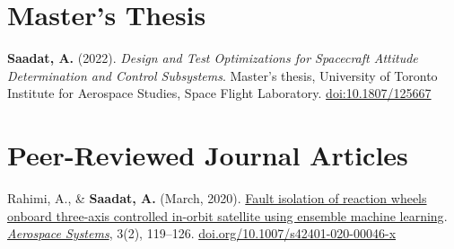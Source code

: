 \documentclass[letterpaper,11pt]{article}
\newcommand{\shiftleft}[2]{\makebox[0pt][r]{\makebox[#1][l]{#2}}}
\newcommand{\cvIcon}[1]{\BeginAccSupp{ActualText={}}#1\EndAccSupp{}}
\def\shiftleft#1#2{}%
\def\faGraduationCap{}%
\def\faBook{}%
\begin{document}
\section[Master's Thesis]{\shiftleft{18pt}{\cvIcon{\faGraduationCap}} Master's Thesis}
 \begin{itemize}[leftmargin=0.15in, label={}]
    \small{
    \item{\textbf{Saadat, A.} (2022). \emph{Design and Test Optimizations for Spacecraft Attitude Determination and Control Subsystems}. Master's thesis, University of Toronto Institute for Aerospace Studies, Space Flight Laboratory. \href{https://doi.org/1807/125667}{doi:10.1807/125667}}
    }
 \end{itemize}

\section[Peer-Reviewed Journal Articles]{\shiftleft{18pt}{\cvIcon{\faBook}} Peer-Reviewed Journal Articles}
 \begin{itemize}[leftmargin=0.15in, label={}]
    \small{
    \item{Rahimi, A., \& \textbf{Saadat, A.} (March, 2020). \href{https://atillasaadat.com/post/adcs-fault-detection-and-isolation-with-ensemble-machine-learning-techniques/}{Fault isolation of reaction wheels onboard three-axis controlled in-orbit satellite using ensemble machine learning}. \emph{\href{https://www.springer.com/journal/42401}{Aerospace Systems}}, 3(2), 119--126. \href{https://doi.org/10.1007/s42401-020-00046-x}{doi.org/10.1007/s42401-020-00046-x}}
    }
 \end{itemize}

\end{document}
